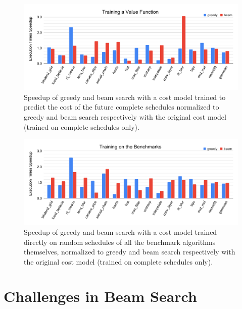 \begin{figure}[!t]
    \centering
    \includegraphics[trim={0cm 1cm 0cm 0cm},width=\textwidth,clip]{figures/training-value-func.pdf}
    \caption{Speedup of greedy and beam search with a cost model trained to predict the cost of the future complete schedules normalized to greedy and beam search respectively with the original cost model (trained on complete schedules only).}
    \label{fig:valuefunc}
\end{figure}

\begin{figure}[!t]
    \centering
    \includegraphics[trim={0cm 1cm 0cm 0cm},width=\textwidth,clip]{figures/training-on-benchmarks.pdf}
    \caption{Speedup of greedy and beam search with a cost model trained directly on random schedules of all the benchmark algorithms themselves, normalized to greedy and beam search respectively with the original cost model (trained on complete schedules only).}
    \label{fig:trainedbenchmarks}
\end{figure}

\section{Challenges in Beam Search}


